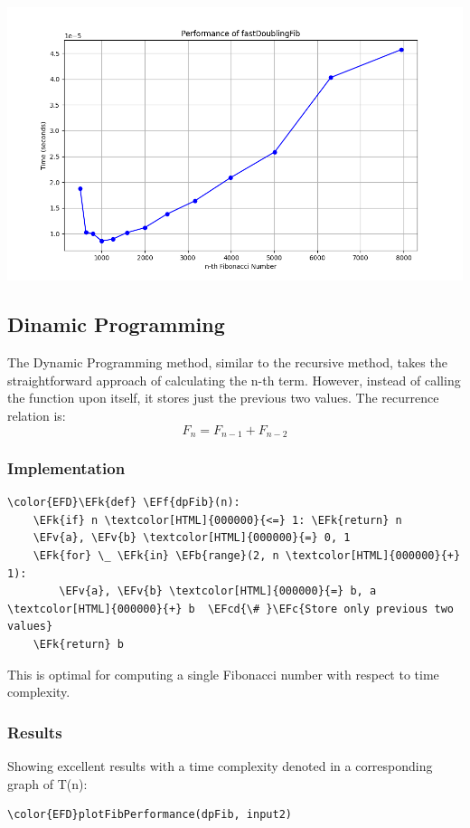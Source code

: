 \documentclass[a4paper,12pt]{article}
\newcommand{\EFc}[1]{\textcolor{EFc}{#1}} %
\newcommand{\EFcd}[1]{\textcolor{EFcd}{#1}} %
\newcommand{\EFk}[1]{\textcolor{EFk}{#1}} %
\newcommand{\EFb}[1]{\textcolor{EFb}{#1}} %
\newcommand{\EFf}[1]{\textcolor{EFf}{#1}} %
\newcommand{\EFv}[1]{\textcolor{EFv}{#1}} %
\begin{document}
\begin{center}
\includegraphics[width=.9\linewidth]{fastDoublingFib.png}
\label{orgdbd0233}
\end{center}
\subsection{Dinamic Programming}
\label{sec:org9cd461e}
The Dynamic Programming method, similar to the recursive method, takes the straightforward approach of calculating the n-th term. However, instead of calling the function upon itself, it stores just the previous two values. The recurrence relation is:
\[F_n = F_{n-1} + F_{n-2}\]
\subsubsection{Implementation}
\label{sec:org0ea12da}
\begin{Code}
\begin{Verbatim}
\color{EFD}\EFk{def} \EFf{dpFib}(n):
    \EFk{if} n \textcolor[HTML]{000000}{<=} 1: \EFk{return} n
    \EFv{a}, \EFv{b} \textcolor[HTML]{000000}{=} 0, 1
    \EFk{for} \_ \EFk{in} \EFb{range}(2, n \textcolor[HTML]{000000}{+} 1):
        \EFv{a}, \EFv{b} \textcolor[HTML]{000000}{=} b, a \textcolor[HTML]{000000}{+} b  \EFcd{\# }\EFc{Store only previous two values}
    \EFk{return} b
\end{Verbatim}
\end{Code}

This is optimal for computing a single Fibonacci number with respect to time complexity.
\subsubsection{Results}
\label{sec:org43a4f8e}
Showing excellent results with a time
complexity denoted in a corresponding graph of T(n):
\begin{Code}
\begin{Verbatim}
\color{EFD}plotFibPerformance(dpFib, input2)
\end{Verbatim}
\end{Code}
\end{document}
